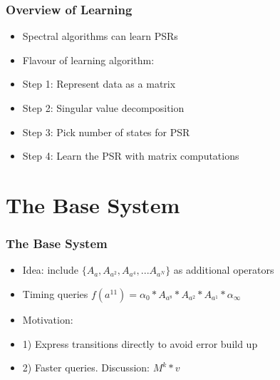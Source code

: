 \documentclass{beamer}
\begin{document}

\begin{frame}
\frametitle{Overview of Learning}

\begin{itemize}
\item Spectral algorithms can learn PSRs 
\item Flavour of learning algorithm: 
\item[] Step 1: Represent data as a matrix
\item[] Step 2: Singular value decomposition
\item[] Step 3: Pick number of states for PSR
\item[] Step 4: Learn the PSR with matrix computations
\end{itemize}

\end{frame}

\section{The Base System}

\begin{frame}
\frametitle{The Base System}
\begin{itemize}

\item Idea: include $\{A_a, A_{a^2}, A_{a^4}, ... A_{a^N}\}$ as additional operators

\item Timing queries $f(a^{11}) = \alpha_0*A_{a^8}*A_{a^2}*A_{a^1}*\alpha_\infty$

\item Motivation: 
\item[] 1) Express transitions directly to avoid error build up
\item[] 2) Faster queries. Discussion: $M^k*v$
\end{itemize}
\end{frame}
\end{document}
